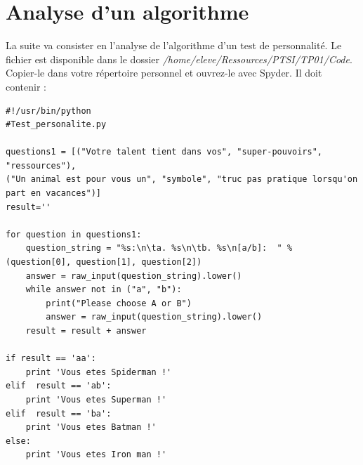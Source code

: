 \section{Analyse d'un algorithme}

La suite va consister en l'analyse de l'algorithme d'un test de personnalité. Le fichier est disponible dans le dossier \textit{/home/eleve/Ressources/PTSI/TP01/Code}. Copier-le dans votre répertoire personnel et ouvrez-le avec Spyder. Il doit contenir :

\begin{verbatim}
#!/usr/bin/python 
#Test_personalite.py 
 
questions1 = [("Votre talent tient dans vos", "super-pouvoirs", "ressources"), 
("Un animal est pour vous un", "symbole", "truc pas pratique lorsqu'on part en vacances")] 
result='' 
 
for question in questions1: 
    question_string = "%s:\n\ta. %s\n\tb. %s\n[a/b]:  " % (question[0], question[1], question[2]) 
    answer = raw_input(question_string).lower() 
    while answer not in ("a", "b"): 
        print("Please choose A or B") 
        answer = raw_input(question_string).lower() 
    result = result + answer 
 
if result == 'aa': 
    print 'Vous etes Spiderman !' 
elif  result == 'ab': 
    print 'Vous etes Superman !' 
elif  result == 'ba': 
    print 'Vous etes Batman !' 
else: 
    print 'Vous etes Iron man !'
\end{verbatim}

